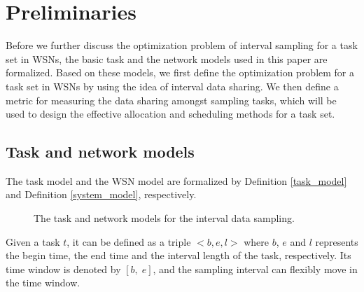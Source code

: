 \documentclass[prodmode,acmtosn]{acmsmall}
\begin{document}
\section{Preliminaries}
\label{section_prelimenary}
Before we further discuss the optimization problem of interval sampling for a task set in WSNs, the basic task and the network models used in this paper are formalized. Based on these models, we first define the optimization problem for a task set in WSNs by using the idea of interval data sharing. We then define a metric for measuring the data sharing amongst sampling tasks, which will be used to design the effective allocation and scheduling methods for a task set.
\subsection{Task and network models}
\label{section_prelimenary_model}
The task model and the WSN model are formalized by Definition \ref{task_model} and Definition \ref{system_model}, respectively.

\begin{figure}[t]
\centering
{}
\hspace{6pt}
\caption{The task and network models for the interval data sampling.}
\label{figure_overview}
\end{figure}


\begin{definition}
Given a task $t$, it can be defined as a triple $\mathrm{<}b,e,l\mathrm{>}$ where $b$, $e$ and $l$ represents the begin time, the end time and the interval length of the task, respectively. Its time window is denoted by $[b,\; e]$, and the sampling interval can flexibly move in the time window. \label{task_model}
\end{definition}
\end{document}
